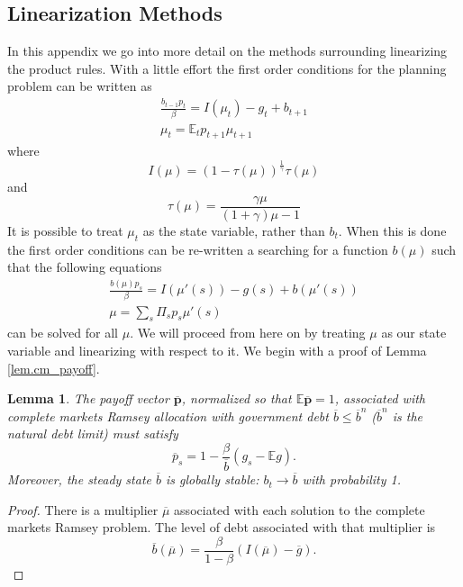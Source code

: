 \documentclass[12pt]{article}
\newcommand{\EE}{\mathbb E}
\newtheorem*{lemma*}{Lemma}
\newcommand{\bbar}{{\overline b}}
\newcommand{\mubar}{{\overline \mu}}
\begin{document}
\begin{appendix}
\section{Linearization Methods}\label{sec:lin_methods}
In this appendix we go into more detail on the methods surrounding linearizing the product rules.  With a little effort the first order conditions for the planning problem can be written as 
\begin{align}
	\frac{b_{t-1} p_t}{\beta} = I(\mu_t) - g_t + b_{t+1}\label{eq.imp}\\
	\mu_t = \EE_t p_{t+1}\mu_{t+1}\label{eq.mart}
\end{align}where 
\begin{equation}
	 I(\mu) = (1-\tau(\mu))^\frac1\gamma \tau(\mu)
\end{equation}and
\begin{equation}
	\tau(\mu) =\frac{\gamma\mu}{(1+\gamma)\mu-1}
\end{equation}  It is possible to treat $\mu_t$ as the state variable, rather than $b_t$.  When this is done the first order conditions can be re-written a searching for a function $b(\mu)$ such that the following equations 
\begin{align}
	\frac{b(\mu)p_s}{\beta} = I(\mu'(s)) - g(s) + b(\mu'(s))\\
	\mu = \sum_{s}\Pi_s p_s\mu'(s)
\end{align}can be solved for all $\mu$.   We will proceed from here on by treating $\mu$ as our state variable and linearizing with respect to it.
We begin with a proof of Lemma \ref{lem.cm_payoff}.
\begin{lemma*}The payoff vector $\overline{\bm p}$, normalized so that $\EE\overline{\bm p} = 1$, associated with complete markets Ramsey allocation with government debt $\overline b \leq \overline b^n$ ($\overline b^n$ is the natural debt limit) must satisfy
	\begin{equation}\label{eq.pbar}
		\overline p_s = 1- \frac{\beta}{\overline b}(g_s - \EE g).
	\end{equation}Moreover, the steady state $\overline b$ is globally stable: $b_t\rightarrow \overline b$ with probability 1.
\end{lemma*}
\begin{proof}  There is a multiplier $\overline \mu$ associated with each solution to the complete markets Ramsey problem.  The level of debt associated with that multiplier is 
\[
	\bbar(\overline\mu) = \frac{\beta}{1-\beta}(I(\mubar)-\overline g).
\]
\end{proof}
\end{appendix}
\end{document}
